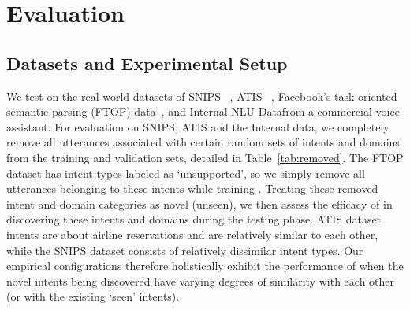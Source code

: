 \section{Evaluation}
\label{sec:evalution}

\subsection{Datasets and Experimental Setup}

We test \mname{} on the real-world datasets 
of SNIPS~\cite{coucke2018}%
, ATIS~\cite{dahl1994}%
, Facebook's task-oriented semantic parsing (FTOP) data~\cite{gupta2018semantic}, and 
Internal NLU Data\footnotemark from a commercial voice assistant. 
For evaluation on SNIPS, ATIS and the Internal data, we completely remove all utterances associated with certain random sets of intents and domains from the training and validation sets, detailed in Table~\ref{tab:removed}. The FTOP dataset has intent types labeled as `unsupported', so we simply remove all utterances belonging to these intents while training \mname{}. Treating these removed intent and domain categories as novel (unseen), we then assess the efficacy of \mname{} in discovering these intents and domains during the testing phase. 
ATIS dataset intents are about airline reservations and are relatively similar to each other, while the SNIPS dataset consists of relatively dissimilar intent types. 
Our empirical configurations therefore holistically exhibit the performance of \mname{} when the novel intents being discovered have varying degrees of similarity with each other (or with the existing `seen' intents). 


\smallskip


